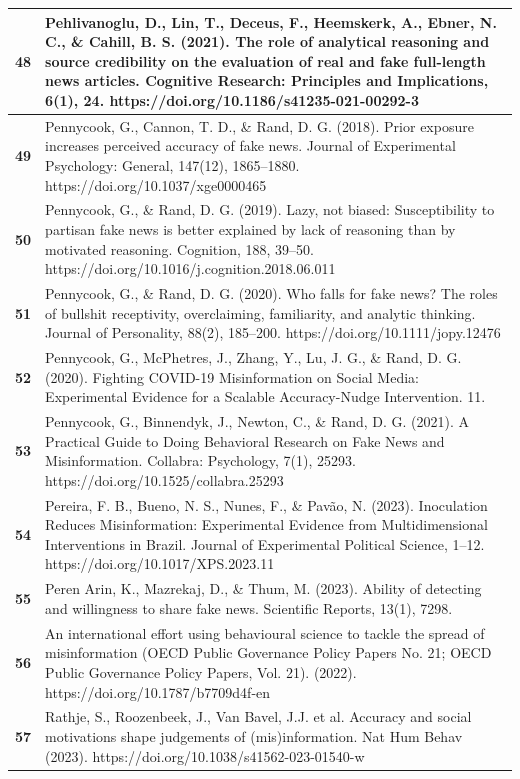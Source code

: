 \documentclass[
  doc,floatsintext]{apa6}
\begin{document}
\begin{longtable}[t]{>{}r||>{\raggedright\arraybackslash}p{30em}}
\hline
\textbf{48} & Pehlivanoglu, D., Lin, T., Deceus, F., Heemskerk, A., Ebner, N. C., \& Cahill, B. S. (2021). The role of analytical reasoning and source credibility on the evaluation of real and fake full-length news articles. Cognitive Research: Principles and Implications, 6(1), 24. https://doi.org/10.1186/s41235-021-00292-3\\
\hline
\textbf{49} & Pennycook, G., Cannon, T. D., \& Rand, D. G. (2018). Prior exposure increases perceived accuracy of fake news. Journal of Experimental Psychology: General, 147(12), 1865–1880. https://doi.org/10.1037/xge0000465\\
\hline
\textbf{50} & Pennycook, G., \& Rand, D. G. (2019). Lazy, not biased: Susceptibility to partisan fake news is better explained by lack of reasoning than by motivated reasoning. Cognition, 188, 39–50. https://doi.org/10.1016/j.cognition.2018.06.011\\
\hline
\textbf{51} & Pennycook, G., \& Rand, D. G. (2020). Who falls for fake news? The roles of bullshit receptivity, overclaiming, familiarity, and analytic thinking. Journal of Personality, 88(2), 185–200. https://doi.org/10.1111/jopy.12476\\
\hline
\textbf{52} & Pennycook, G., McPhetres, J., Zhang, Y., Lu, J. G., \& Rand, D. G. (2020). Fighting COVID-19 Misinformation on Social Media: Experimental Evidence for a Scalable Accuracy-Nudge Intervention. 11.\\
\hline
\textbf{53} & Pennycook, G., Binnendyk, J., Newton, C., \& Rand, D. G. (2021). A Practical Guide to Doing Behavioral Research on Fake News and Misinformation. Collabra: Psychology, 7(1), 25293. https://doi.org/10.1525/collabra.25293\\
\hline
\textbf{54} & Pereira, F. B., Bueno, N. S., Nunes, F., \& Pavão, N. (2023). Inoculation Reduces Misinformation: Experimental Evidence from Multidimensional Interventions in Brazil. Journal of Experimental Political Science, 1–12. https://doi.org/10.1017/XPS.2023.11\\
\hline
\textbf{55} & Peren Arin, K., Mazrekaj, D., \& Thum, M. (2023). Ability of detecting and willingness to share fake news. Scientific Reports, 13(1), 7298.\\
\hline
\textbf{56} & An international effort using behavioural science to tackle the spread of misinformation (OECD Public Governance Policy Papers No. 21; OECD Public Governance Policy Papers, Vol. 21). (2022). https://doi.org/10.1787/b7709d4f-en\\
\hline
\textbf{57} & Rathje, S., Roozenbeek, J., Van Bavel, J.J. et al. Accuracy and social motivations shape judgements of (mis)information. Nat Hum Behav (2023). https://doi.org/10.1038/s41562-023-01540-w\\

\end{longtable}
\end{document}
